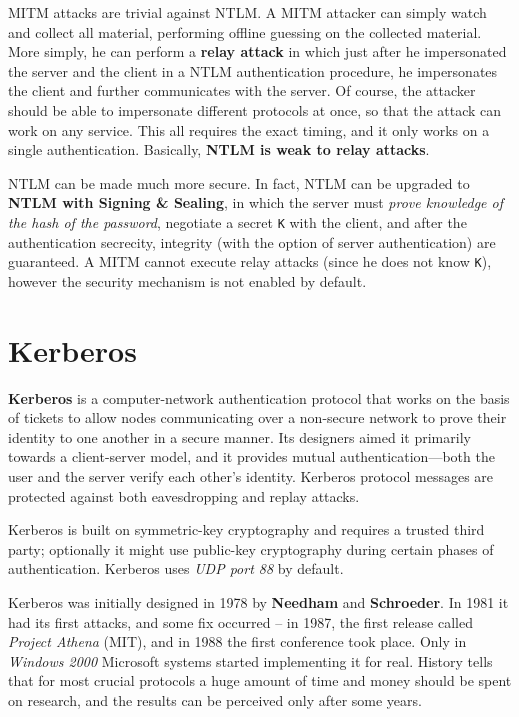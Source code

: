 \documentclass[10pt]{\classname}
\begin{document}
MITM attacks are trivial against NTLM. A MITM attacker can simply watch and
collect all material, performing offline guessing on the collected material.
More simply, he can perform a \textbf{relay attack} in which just after he
impersonated the server and the client in a NTLM authentication procedure, he
impersonates the client and further communicates with the server. Of course,
the attacker should be able to impersonate different protocols at once, so that
the attack can work on any service. This all requires the exact timing, and it
only works on a single authentication. Basically, \textbf{NTLM is weak to relay
attacks}.

NTLM can be made much more secure. In fact, NTLM can be upgraded to
\textbf{NTLM with Signing \& Sealing}, in which the server must \emph{prove
knowledge of the hash of the password}, negotiate a secret \texttt{K} with the
client, and after the authentication secrecity, integrity (with the option of
server authentication) are guaranteed. A MITM cannot execute relay attacks
(since he does not know \texttt{K}), however the security mechanism is not
enabled by default.

\section{Kerberos}
\textbf{Kerberos} is a computer-network authentication protocol that
works on the basis of tickets to allow nodes communicating over a non-secure
network to prove their identity to one another in a secure manner. Its
designers aimed it primarily towards a client-server model, and it provides mutual
authentication—both the user and the server verify each other's identity.
Kerberos protocol messages are protected against both eavesdropping and replay
attacks.

Kerberos is built on symmetric-key cryptography and requires a trusted third
party; optionally it might use public-key cryptography during certain phases of
authentication. Kerberos uses \emph{UDP port 88} by default.

Kerberos was initially designed in 1978 by \textbf{Needham} and
\textbf{Schroeder}. In 1981 it had its first attacks, and some fix occurred --
in 1987, the first release called \emph{Project Athena} (MIT), and in 1988 the
first conference took place. Only in \emph{Windows 2000} Microsoft systems
started implementing it for real. History tells that for most crucial protocols
a huge amount of time and money should be spent on research, and the results
can be perceived only after some years.
\end{document}
